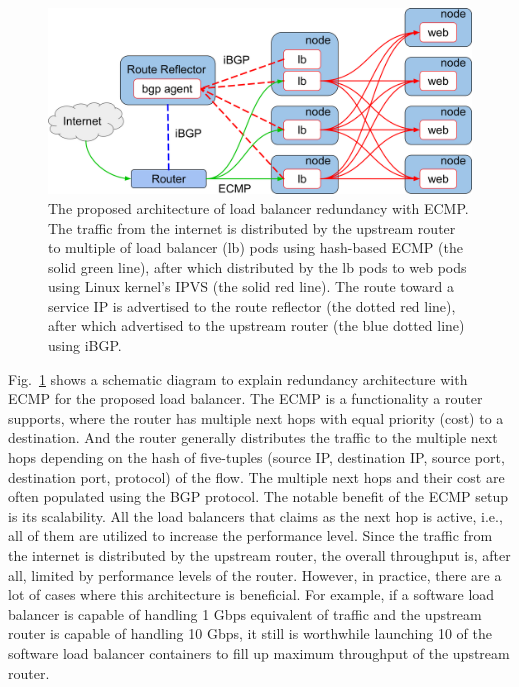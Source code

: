 \begin{figure}[h]
  \centering
  \includegraphics[width=0.9\columnwidth]{Figs/ecmp.png}

  \par\bigskip
  \centering
  \begin{minipage}{0.9\columnwidth}
    \caption[The proposed architecture of load balancer redundancy with ECMP]{
The proposed architecture of load balancer redundancy with ECMP.
   The traffic from the internet is distributed by the upstream router to multiple of load balancer (lb) pods using hash-based ECMP (the solid green line), after which distributed by the lb pods to web pods using Linux kernel's IPVS (the solid red line).
  The route toward a service IP is advertised to the route reflector (the dotted red line), after which advertised to the upstream router (the blue dotted line) using iBGP.
    }
    \label{fig:ecmp}
  \end{minipage}

\end{figure}

Fig.~\ref{fig:ecmp} shows a schematic diagram to explain redundancy architecture with ECMP for the proposed load balancer.
%
The ECMP is a functionality a router supports, where the router has multiple next hops with equal priority (cost) to a destination.
And the router generally distributes the traffic to the multiple next hops depending on the hash of five-tuples (source IP, destination IP, source port, destination port, protocol) of the flow.
The multiple next hops and their cost are often populated using the BGP protocol.
%
The notable benefit of the ECMP setup is its scalability.
All the load balancers that claims as the next hop is active, i.e., all of them are utilized to increase the performance level.
Since the traffic from the internet is distributed by the upstream router, the overall throughput is, after all, limited by performance levels of the router.
However, in practice, there are a lot of cases where this architecture is beneficial.
For example, if a software load balancer is capable of handling 1 Gbps equivalent of traffic and the upstream router is capable of handling 10 Gbps, it still is worthwhile launching 10 of the software load balancer containers to fill up maximum throughput of the upstream router.

